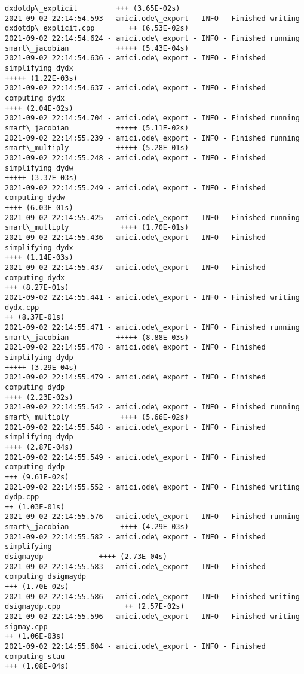 \documentclass[11pt]{article}
\begin{document}
\begin{Verbatim}[commandchars=\\\{\}]
dxdotdp\_explicit         +++ (3.65E-02s)
2021-09-02 22:14:54.593 - amici.ode\_export - INFO - Finished writing
dxdotdp\_explicit.cpp        ++ (6.53E-02s)
2021-09-02 22:14:54.624 - amici.ode\_export - INFO - Finished running
smart\_jacobian           +++++ (5.43E-04s)
2021-09-02 22:14:54.636 - amici.ode\_export - INFO - Finished simplifying dydx
+++++ (1.22E-03s)
2021-09-02 22:14:54.637 - amici.ode\_export - INFO - Finished computing dydx
++++ (2.04E-02s)
2021-09-02 22:14:54.704 - amici.ode\_export - INFO - Finished running
smart\_jacobian           +++++ (5.11E-02s)
2021-09-02 22:14:55.239 - amici.ode\_export - INFO - Finished running
smart\_multiply           +++++ (5.28E-01s)
2021-09-02 22:14:55.248 - amici.ode\_export - INFO - Finished simplifying dydw
+++++ (3.37E-03s)
2021-09-02 22:14:55.249 - amici.ode\_export - INFO - Finished computing dydw
++++ (6.03E-01s)
2021-09-02 22:14:55.425 - amici.ode\_export - INFO - Finished running
smart\_multiply            ++++ (1.70E-01s)
2021-09-02 22:14:55.436 - amici.ode\_export - INFO - Finished simplifying dydx
++++ (1.14E-03s)
2021-09-02 22:14:55.437 - amici.ode\_export - INFO - Finished computing dydx
+++ (8.27E-01s)
2021-09-02 22:14:55.441 - amici.ode\_export - INFO - Finished writing dydx.cpp
++ (8.37E-01s)
2021-09-02 22:14:55.471 - amici.ode\_export - INFO - Finished running
smart\_jacobian           +++++ (8.88E-03s)
2021-09-02 22:14:55.478 - amici.ode\_export - INFO - Finished simplifying dydp
+++++ (3.29E-04s)
2021-09-02 22:14:55.479 - amici.ode\_export - INFO - Finished computing dydp
++++ (2.23E-02s)
2021-09-02 22:14:55.542 - amici.ode\_export - INFO - Finished running
smart\_multiply            ++++ (5.66E-02s)
2021-09-02 22:14:55.548 - amici.ode\_export - INFO - Finished simplifying dydp
++++ (2.87E-04s)
2021-09-02 22:14:55.549 - amici.ode\_export - INFO - Finished computing dydp
+++ (9.61E-02s)
2021-09-02 22:14:55.552 - amici.ode\_export - INFO - Finished writing dydp.cpp
++ (1.03E-01s)
2021-09-02 22:14:55.576 - amici.ode\_export - INFO - Finished running
smart\_jacobian            ++++ (4.29E-03s)
2021-09-02 22:14:55.582 - amici.ode\_export - INFO - Finished simplifying
dsigmaydp             ++++ (2.73E-04s)
2021-09-02 22:14:55.583 - amici.ode\_export - INFO - Finished computing dsigmaydp
+++ (1.70E-02s)
2021-09-02 22:14:55.586 - amici.ode\_export - INFO - Finished writing
dsigmaydp.cpp               ++ (2.57E-02s)
2021-09-02 22:14:55.596 - amici.ode\_export - INFO - Finished writing sigmay.cpp
++ (1.06E-03s)
2021-09-02 22:14:55.604 - amici.ode\_export - INFO - Finished computing stau
+++ (1.08E-04s)

\end{Verbatim}
\end{document}
